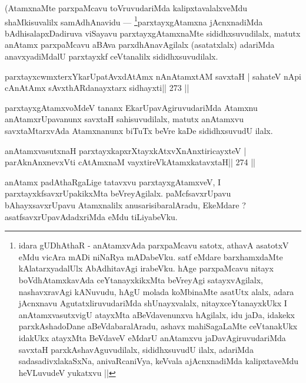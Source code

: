 \begin{artha}
(AtamxnaMte parxpaMcavu toVruvudariMda kalipxtavalalxveMdu shaMkisuvalilx samAdhA\-navidu {\rm ---}  \footnote[3]{idara gUDhAthaR - anAtamxvAda parxpaMcavu satotx, athavA asatotxV eMdu vicAra mADi niNaRya mADabeVku. satf eMdare barxhamxdaMte kAlatarxyadalUlx AbAdhitavAgi irabeVku. hAge parxpaMcavu nitayx boVdhAtamxkavAda ceYtanayxkikxMta beVreyAgi satayxvAgilalx, nashavxravAgi kANuvudu, hAgU molada koMbinaMte asatUtx alalx, adara jAcnxnavu AgutatxliruvudariMda shUnayxvalalx, nitayxceYtanayxkUkx I anAtamxvasutxvigU atayxMta aBeVdavenunxva hAgilalx, idu jaDa, idakekx parxkAshadoDane aBeVdabaralAradu, ashavx mahiSagaLaMte ceVtanakUkx idakUkx atayxMta BeVdaveV eMdarU anAtamxvu jaDavAgiruvudariMda savxtaH parxkAshavAguvudilalx, sididhxsuvudU ilalx, adariMda sadasadivxlakaSxNa, anivaRcaniVya, keVvala ajAcnxnadiMda kalipxtaveMdu heVLuvudeV yukatxvu ||}parxtayxgAtamxna jAcnxnadiMda bAdhisalapxDadiruva viSayavu parxtayxgAtamxnaMte sididhxsuvudilalx, matutx anAtamx parxpaMcavu aBAva parxdhAnavAgilalx (asatatxlalx) adariMda anavxyadiMdalU parxtayxkf ceVtanalilx sididhxsuvudilalx.
\end{artha}


\begin{shl}
parxtayxcwmxterxYkarUpatAvxdAtAmx nAnAtamxtAM savxtaH |
sahateV nApi cAnAtAmx sAvxthARdanayxtarx sidhayxti\hfill || 273 ||
\end{shl}

\begin{artha}
parxtayxgAtamxvoMdeV tananx EkarUpavAgiruvudariMda Atamxnu anAtamxrUpavanunx savxtaH sahisuvudilalx, matutx anAtamxvu savxtaMtarxvAda Atamxnanunx biTuTx beVre kaDe sididhxsuvudU ilalx.
\end{artha}

\begin{shl}
anAtamxvasutxnaH parxtayxkapxrXtayxkAtxvXnAnxtiricayxteV |
parAknAnxnevxVti cA\s\s tAmxnaM vayxtireVkAtamxkatavxtaH\hfill || 274 ||
\end{shl}

\begin{artha}
anAtamx padAthaRgaLige tatavxvu parxtayxgAtamxveV, I parxtayxkfsavxrUpakikxMta beVre\-yAgilalx. paMcfsavxrUpavu bAhayxsavxrUpavu Atamxnalilx anusarisibaralAradu, EkeMdare ? asatfsavxrUpavAdadxriMda eMdu tiLiyabeVku.
\end{artha}

